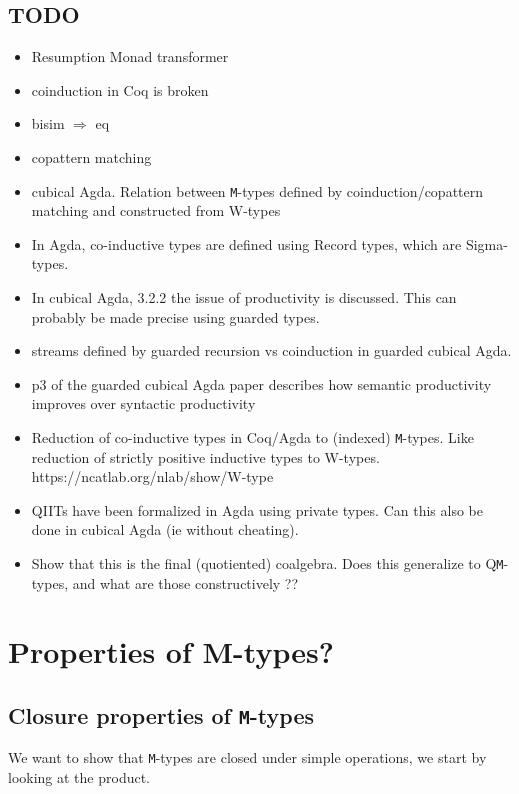 \documentclass[twoside,11pt,openright]{report}
\theoremstyle{plain} %
\theoremstyle{definition}
\theoremstyle{remark}
\begin{document}
\section{TODO}
\begin{itemize}
\item Resumption Monad transformer
\item coinduction in Coq is broken
\item bisim \(\Rightarrow\) eq
\item copattern matching
\item cubical Agda. Relation between \texttt{M}-types defined by coinduction/copattern matching and constructed from W-types
\item   In Agda, co-inductive types are defined using Record types, which are Sigma-types. 
\item   In cubical Agda, 3.2.2 the issue of productivity is discussed. This can probably be made precise using guarded types.
\item streams defined by guarded recursion vs coinduction in guarded cubical Agda. 
\item    p3 of the guarded cubical Agda paper describes how semantic productivity improves over syntactic productivity
\item Reduction of co-inductive types in Coq/Agda to (indexed) \texttt{M}-types. Like reduction of strictly positive inductive types to W-types. https://ncatlab.org/nlab/show/W-type
\item QIITs have been formalized in Agda using private types. Can this also be done in cubical Agda (ie without cheating).
\item   Show that this is the final (quotiented) coalgebra. Does this generalize to Q\texttt{M}-types, and what are those constructively ??
\end{itemize}


\chapter{Properties of M-types?}
\section{Closure properties of \texttt{M}-types}
We want to show that \texttt{M}-types are closed under simple operations, we start by looking at the product.
\end{document}
